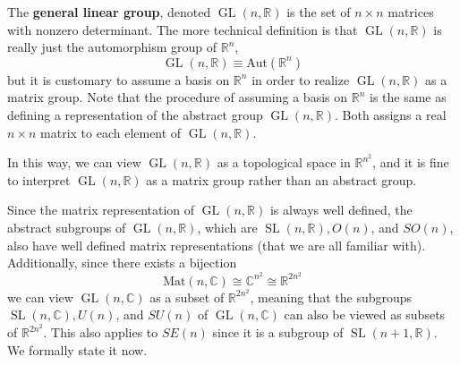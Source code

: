 \documentclass{article}
\DeclareMathOperator{\GL}{GL}
\DeclareMathOperator{\SL}{SL}
\begin{document}
    \begin{definition}
      The \textbf{general linear group}, denoted $\GL(n, \mathbb{R})$ is the set of $n \times n$ matrices with nonzero determinant. The more technical definition is that $\GL(n, \mathbb{R})$ is really just the automorphism group of $\mathbb{R}^n$, 
      \begin{equation}
        \GL(n, \mathbb{R}) \equiv \text{Aut}(\mathbb{R}^n)
      \end{equation}
      but it is customary to assume a basis on $\mathbb{R}^n$ in order to realize $\GL(n, \mathbb{R})$ as a matrix group. Note that the procedure of assuming a basis on $\mathbb{R}^n$ is the same as defining a representation of the abstract group $\GL(n, \mathbb{R})$. Both assigns a real $n \times n$ matrix to each element of $\GL(n, \mathbb{R})$. 
    \end{definition}

    In this way, we can view $\GL(n, \mathbb{R})$ as a topological space in $\mathbb{R}^{n^2}$, and it is fine to interpret $\GL(n, \mathbb{R})$ as a matrix group rather than an abstract group. 

    Since the matrix representation of $\GL(n, \mathbb{R})$ is always well defined, the abstract subgroups of $\GL(n, \mathbb{R})$, which are $\SL(n, \mathbb{R}), O(n)$, and $SO(n)$, also have well defined matrix representations (that we are all familiar with). Additionally, since there exists a bijection
    \begin{equation}
      \text{Mat}(n, \mathbb{C}) \cong \mathbb{C}^{n^2} \cong \mathbb{R}^{2 n^2}
    \end{equation}
    we can view $\GL(n, \mathbb{C})$ as a subset of $\mathbb{R}^{2n^2}$, meaning that the subgroups $\SL(n, \mathbb{C}), U(n)$, and $SU(n)$ of $\GL(n, \mathbb{C})$ can also be viewed as subsets of $\mathbb{R}^{2n^2}$. This also applies to $SE(n)$ since it is a subgroup of $\SL(n+1, \mathbb{R})$. We formally state it now. 
\end{document}
